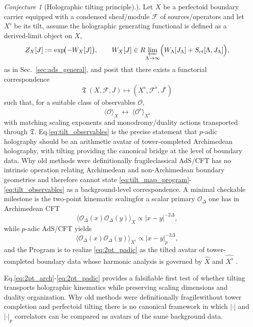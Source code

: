 \documentclass[11pt]{article}
\theoremstyle{remark}
\newtheorem{conjecture}{Conjecture}
\begin{document}
\begin{conjecture}[Holographic tilting principle).]
Let \(X\) be a perfectoid boundary carrier equipped with a condensed sheaf/module \(\mathcal{F}\) of sources/operators and let \(X^{\flat}\) be its tilt, assume the holographic generating functional is defined as a derived-limit object on \(X\),
\begin{equation}\label{eq:Zren_X}
Z_{X}[J]:=\exp\!\bigl(-W_{X}[J]\bigr),\qquad W_{X}[J]\in R\!\varprojlim_{\Lambda\to\infty}\Bigl(W_{\Lambda}[J_{\Lambda}]+S_{\mathrm{ct}}[\Lambda,J_{\Lambda}]\Bigr),
\end{equation}
as in Sec.~\ref{sec:ads_general}, and posit that there exists a functorial correspondence
\begin{equation}\label{eq:tilt_map_program}
\mathfrak{T}\:(X,\mathcal{F},J)\longmapsto (X^{\flat},\mathcal{F}^{\flat},J^{\flat})
\end{equation}
such that, for a suitable class of observables \(\mathcal{O}\),
\begin{equation}\label{eq:tilt_observables}
\langle \mathcal{O}\rangle_{X} \ \longleftrightarrow\ \langle \mathcal{O}^{\flat}\rangle_{X^{\flat}}
\end{equation}
with matching scaling exponents and monodromy/duality actions transported through \(\mathfrak{T}\). Eq.\eqref{eq:tilt_observables} is the precise statement that \(p\)-adic holography should be an arithmetic avatar of tower-completed Archimedean holography, with tilting providing the canonical bridge at the level of boundary data. Why old methods were definitionally fragile\:classical AdS/CFT has no intrinsic operation relating Archimedean and non-Archimedean boundary geometries and therefore cannot state \eqref{eq:tilt_map_program}-\eqref{eq:tilt_observables} as a background-level correspondence. A minimal checkable milestone is the two-point kinematic scaling\:for a scalar primary \(\mathcal{O}_{\Delta}\) one has in Archimedean CFT
\begin{equation}\label{eq:2pt_arch}
\langle \mathcal{O}_{\Delta}(x)\mathcal{O}_{\Delta}(y)\rangle_{X}\propto |x-y|^{-2\Delta},
\end{equation}
while \(p\)-adic AdS/CFT yields
\begin{equation}\label{eq:2pt_padic}
\langle \mathcal{O}_{\Delta}(x)\mathcal{O}_{\Delta}(y)\rangle_{X^{\flat}}\propto |x-y|_{p}^{-2\Delta},
\end{equation}
and the Program is to realize \eqref{eq:2pt_padic} as the tilted avatar of tower-completed boundary data whose harmonic analysis is governed by \(\widehat{X}\) and \(\widehat{X^{\flat}}\) \cite{Gubser2017, Heydeman2018}. 
\end{conjecture}
Eq.\eqref{eq:2pt_arch}-\eqref{eq:2pt_padic} provides a falsifiable first test of whether tilting transports holographic kinematics while preserving scaling dimensions and duality organization. Why old methods were definitionally fragile\:without tower completion and perfectoid tilting there is no canonical framework in which \(|\cdot|\) and \(|\cdot|_{p}\) correlators can be compared as avatars of the same background data.
\end{document}
